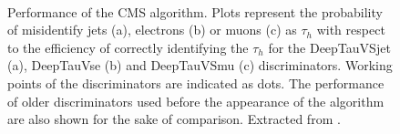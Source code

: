 \documentclass[../main.tex]{subfiles}
\begin{document}
\begin{figure}[h!]
\begin{center}
 \\
\end{center}
\caption{Performance of the CMS \deeptau{} algorithm. Plots represent the probability of misidentify jets (a), electrons (b) or muons (c) as $\tau_h$ with respect to the efficiency of correctly identifying the $\tau_h$ for the DeepTauVSjet (a), DeepTauVse (b) and DeepTauVSmu (c) discriminators. Working points of the discriminators are indicated as dots. The performance of older discriminators used before the appearance of the \deeptau{} algorithm are also shown for the sake of comparison. Extracted from \cite{intro:id:deeptau}.}
\label{intro:fig:deeptau}
\end{figure}
\end{document}
